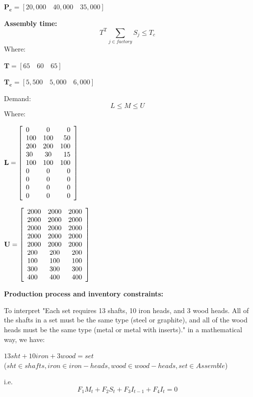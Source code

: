 \documentclass[12pt]{article}
\begin{document}
\begin{center}
$\mathbf{P_c} = 
\left[
20,000\quad  40,000\quad  35,000
\right]
$
\end{center}
\noindent
\textbf{Assembly time:}
\begin{equation}
T^\mathrm{T}
\sum\limits_{j\in factory} {S_j}
\leq T_c
\end{equation}
Where:
\begin{center}
$\mathbf{T} = 
\left[
65\quad  60\quad  65
\right]
$
\end{center}

\begin{center}
$\mathbf{T_c} = 
\left[
5,500\quad  5,000\quad  6,000
\right]
$
\end{center}
Demand:
\begin{equation}
L\leq M \leq U
\end{equation}
Where:
\begin{center}
$\mathbf{L} = 
\left[
\begin{array}{l c r}
0   & 0   & 0   \\
100 & 100 & 50  \\
200 & 200 & 100 \\
30  & 30  & 15  \\
100 & 100 & 100 \\
0   & 0   & 0   \\
0   & 0   & 0   \\
0   & 0   & 0   \\
0   & 0   & 0 
\end{array}
\right]
$
\end{center}

\begin{center}
$\mathbf{U} = 
\left[
\begin{array}{l c r}
2000 & 2000& 2000 \\
2000 & 2000& 2000 \\
2000 & 2000& 2000 \\
2000 & 2000& 2000 \\
2000 & 2000& 2000 \\
200  &200  & 200  \\
100  &100  & 100  \\
300  &300  & 300  \\
400  &400  & 400  
\end{array}
\right]
$
\end{center}
\noindent
\textbf{Production process and inventory constraints:}

To interpret "Each set requires 13 shafts, 10 iron heads, and 3 wood heads. All of the shafts in a set must be the same type (steel or graphite), and all of the wood heads must be the same type (metal or metal with inserts)." in a mathematical way, we have:\\
\begin{center}
    $13sht+10iron+3wood=set$\\
($sht\in shafts,iron\in iron-heads,wood\in wood-heads,set\in Assemble$)
\end{center}
i.e.
\begin{equation}
    F_1M_t+F_2S_t+F_3I_{t-1}+F_4I_t = 0
\end{equation}
\end{document}

